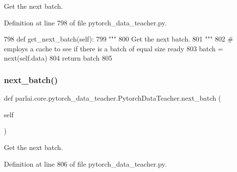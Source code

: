 \begin{DoxyVerb}Get the next batch.
\end{DoxyVerb}
 

Definition at line 798 of file pytorch\+\_\+data\+\_\+teacher.\+py.


\begin{DoxyCode}
798     \textcolor{keyword}{def }get\_next\_batch(self):
799         \textcolor{stringliteral}{"""}
800 \textcolor{stringliteral}{        Get the next batch.}
801 \textcolor{stringliteral}{        """}
802         \textcolor{comment}{# employs a cache to see if there is a batch of equal size ready}
803         batch = next(self.data)
804         \textcolor{keywordflow}{return} batch
805 
\end{DoxyCode}
\mbox{\label{classparlai_1_1core_1_1pytorch__data__teacher_1_1PytorchDataTeacher_aa4e63cd7dd1a904a8424a096f7ca1f63}} 
\subsubsection{\texorpdfstring{next\+\_\+batch()}{next\_batch()}}
{\footnotesize\ttfamily def parlai.\+core.\+pytorch\+\_\+data\+\_\+teacher.\+Pytorch\+Data\+Teacher.\+next\+\_\+batch (\begin{DoxyParamCaption}\item[{}]{self }\end{DoxyParamCaption})}

\begin{DoxyVerb}Get the next batch.
\end{DoxyVerb}
 

Definition at line 806 of file pytorch\+\_\+data\+\_\+teacher.\+py.


